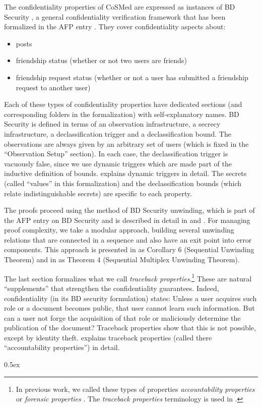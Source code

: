 \documentclass[11pt,a4paper]{article}
\begin{document}
The confidentiality properties of CoSMed are expressed as instances of BD Security \cite{BDsecurity-ITP2021}, a general confidentiality verification framework that has been formalized in the AFP entry \cite{BDSecurity-AFP}. They cover confidentiality aspects about:
\begin{itemize}
	\item posts
	\item friendship status (whether or not two users are friends)
	\item friendship request status (whether or not a user has submitted a friendship request to another user)
\end{itemize}
%
Each of these types of confidentiality properties have dedicated sections (and corresponding folders in the formalization) with self-explanatory names.  BD Security is defined in terms of an observation infrastructure, a secrecy infrastructure,  a declassification trigger and a declassification bound. The observations are always given by an arbitrary set of users (which is fixed in the ``Observation Setup'' section). In each case, the
declassification trigger is vacuously false, since we use dynamic triggers which are made part of the inductive definition of bounds. \cite[Section 3.3]{cosmed-itp2016} explains dynamic triggers in detail. The secrets (called ``values'' in this formalization) and the declassification bounds (which relate indistinguishable secrets) are specific to each property.

The proofs proceed using the method of BD Security unwinding, which
is part of the AFP entry on BD Security \cite{BDSecurity-AFP} and
is described in detail in \cite[Section 4.1]{cocon-JAR2021} and \cite[Section 2.6]{BDsecurity-ITP2021}.  For managing proof complexity, we take a modular approach, building several
unwinding relations that are connected in a sequence and also have an exit point into error components. This approach is presented in \cite{cocon-JAR2021} as Corollary 6 (Sequential Unwinding Theorem)
and in \cite{BDsecurity-ITP2021} as Theorem 4 (Sequential Multiplex Unwinding Theorem).

The last section formalizes what we call \emph{traceback properties}.\footnote{In previous work, we called
	these types of properties  \emph{accountability properties}  \cite{cosmed-itp2016,cosmed-jar2018} or \emph{forensic properties} \cite{cocon-CAV2014}.
	The  \emph{traceback properties} terminology is used in \cite{cocon-JAR2021}.}
These are natural ``supplements'' that strengthen the confidentiality guarantees. Indeed, confidentiality (in its BD security formulation) states: Unless a user acquires such role or a document becomes public, that user cannot learn such information. But can a user not forge the acquisition of that role or maliciously determine the publication of the document? Traceback properties show that this is not possible, except by identity theft. \cite[Section 5.2]{cosmed-itp2016} explains traceback properties (called there ``accountability properties'') in detail.


\parindent 0pt\parskip 0.5ex





\end{document}
